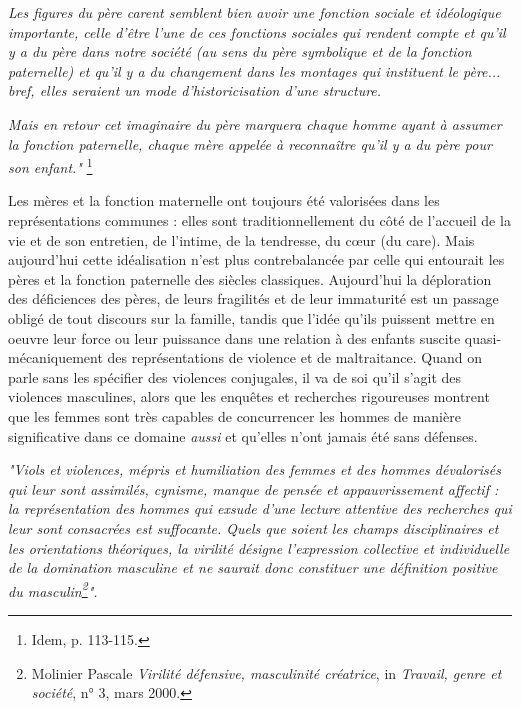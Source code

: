 {\begin{displayquote}
\emph{Les figures du père carent semblent bien avoir une fonction sociale et idéologique importante, celle d'être l'une de ces fonctions sociales qui rendent compte et qu'il y a du père dans notre société (au sens du père symbolique et de la fonction paternelle) et qu'il y a du changement dans les montages qui instituent le père... bref, elles seraient un mode d'historicisation d'une structure.}

\emph{Mais en retour cet imaginaire du père marquera chaque homme ayant à assumer la fonction paternelle, chaque mère appelée à reconnaître qu'il y a du père pour son enfant."}%
\footnote{Idem, p. 113-115.}
\end{displayquote}

 Les mères et la fonction maternelle ont toujours été valorisées dans les représentations communes : elles sont traditionnellement du côté de l'accueil de la vie et de son entretien, de l'intime, de la tendresse, du cœur (du care). Mais aujourd'hui cette idéalisation n'est plus contrebalancée par celle qui entourait les pères et la fonction paternelle des siècles classiques. Aujourd'hui la déploration des déficiences des pères, de leurs fragilités et de leur immaturité est un passage obligé de tout discours sur la famille, tandis que l'idée qu'ils puissent mettre en oeuvre leur force ou leur puissance dans une relation à des enfants suscite quasi-mécaniquement des représentations de violence et de maltraitance. Quand on parle sans les spécifier des violences conjugales, il va de soi qu'il s'agit des violences masculines, alors que les enquêtes et recherches rigoureuses montrent que les femmes sont très capables de concurrencer les hommes de manière significative dans ce domaine \emph{aussi} et qu'elles n'ont jamais été sans défenses.
 
 \begin{displayquote}
 \emph{"Viols et violences, mépris et humiliation des femmes et des hommes dévalorisés qui leur sont assimilés, cynisme, manque de pensée et appauvrissement affectif : la représentation des hommes qui exsude d'une lecture attentive des recherches qui leur sont consacrées est suffocante. Quels que soient les champs disciplinaires et les orientations théoriques, la virilité désigne l'expression collective et individuelle de la domination masculine et ne saurait donc constituer une définition positive du masculin\footnote{Molinier Pascale \emph{Virilité défensive, masculinité créatrice}, in  \emph{Travail, genre et société}, n° 3, mars 2000.}".}
 \end{displayquote}
 
}
